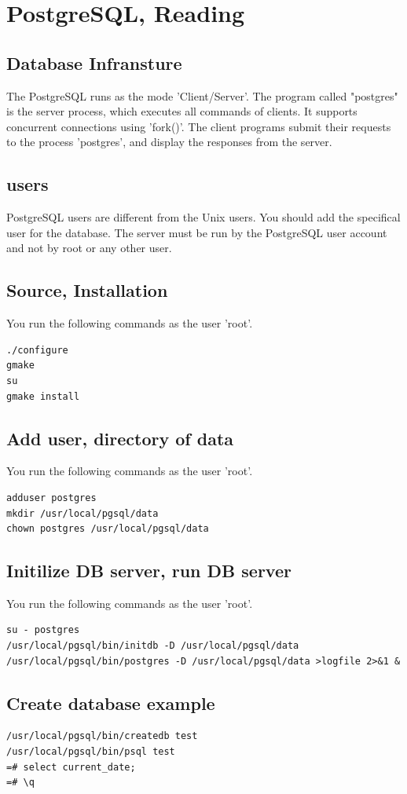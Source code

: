 \section{PostgreSQL, Reading}
\subsection{Database Infransture}
The PostgreSQL runs as the mode 'Client/Server'. 
The program called "postgres" is the server process, which executes all commands of clients. It supports concurrent connections using 'fork()'.
The client programs submit their requests to the process 'postgres', and display the responses from the server.
\subsection{users}
PostgreSQL users are different from the Unix users.
You should add the specifical user for the database.
The server must be run by the PostgreSQL user account and not by root or any other user.
\subsection{Source, Installation}
You run the following commands as the user 'root'.
\begin{verbatim}
./configure
gmake
su
gmake install
\end{verbatim}

\subsection{Add user, directory of data}
You run the following commands as the user 'root'.
\begin{verbatim}
adduser postgres
mkdir /usr/local/pgsql/data
chown postgres /usr/local/pgsql/data
\end{verbatim}

\subsection{Initilize DB server, run DB server}
You run the following commands as the user 'root'.
\begin{verbatim}
su - postgres
/usr/local/pgsql/bin/initdb -D /usr/local/pgsql/data
/usr/local/pgsql/bin/postgres -D /usr/local/pgsql/data >logfile 2>&1 &
\end{verbatim}

\subsection{Create database example}
\begin{verbatim}
/usr/local/pgsql/bin/createdb test
/usr/local/pgsql/bin/psql test
=# select current_date;
=# \q
\end{verbatim}

